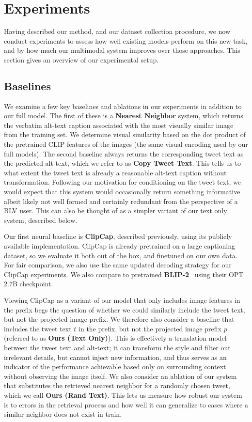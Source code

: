 \documentclass{article} %
\begin{document}
\section{Experiments}

Having described our method, and our dataset collection procedure, we now conduct experiments to assess how well existing models perform on this new task, and by how much our multimodal system improves over those approaches.
This section gives an overview of our experimental setup.

\subsection{Baselines}

We examine a few key baselines and ablations in our experiments in addition to our full model.
The first of these is a \textbf{Nearest Neighbor} system, which returns the verbatim alt-text caption associated with the most visually similar image from the training set.
We determine visual similarity based on the dot product of the pretrained CLIP features of the images (the same visual encoding used by our full models).
The second baseline always returns the corresponding tweet text as the predicted alt-text, which we refer to as \textbf{Copy Tweet Text}.
This tells us to what extent the tweet text is already a reasonable alt-text caption without transformation.
Following our motivation for conditioning on the tweet text, we would expect that this system would occasionally return something informative albeit likely not well formed and certainly redundant from the perspective of a BLV user.
This can also be thought of as a simpler variant of our text only system, described below.

Our first neural baseline is \textbf{ClipCap}, described previously, using its publicly available implementation.
ClipCap is already pretrained on a large captioning dataset, so we evaluate it both out of the box, and finetuned on our own data.
For fair comparison, we also use the same updated decoding strategy for our ClipCap experiments.
We also compare to pretrained \textbf{BLIP-2}~\citep{blip2} using their OPT~\citep{opt} 2.7B checkpoint.

Viewing ClipCap as a variant of our model that only includes image features in the prefix begs the question of whether we could similarly include the tweet text, but not the projected image prefix.
We therefore also consider a baseline that includes the tweet text $t$ in the prefix, but not the projected image prefix $p$ (referred to as \textbf{Ours (Text Only)}).
This is effectively a translation model between the tweet text and alt-text; it can transform the style and filter out irrelevant details, but cannot inject new information, and thus serves as an indicator of the performance achievable based only on surrounding context without observing the image itself.
We also consider an ablation of our system that substitutes the retrieved nearest neighbor for a randomly chosen tweet, which we call \textbf{Ours (Rand Text)}.
This lets us measure how robust our system is to errors in the retrieval process and how well it can generalize to cases where a similar neighbor does not exist in train.
\end{document}
